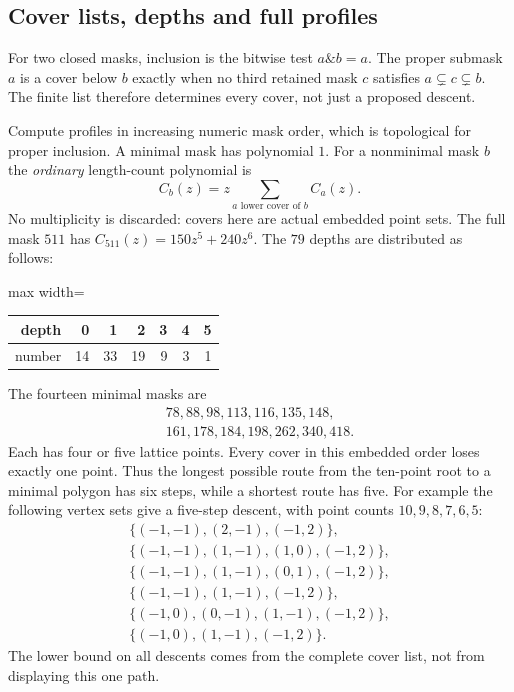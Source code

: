 \documentclass[manuscript]{aomart}
\theoremstyle{definition}
\theoremstyle{remark}
\begin{document}
\subsection{Cover lists, depths and full profiles}
For two closed masks, inclusion is the bitwise test $a\mathbin{\&}b=a$.
The proper submask $a$ is a cover below $b$ exactly when no third retained
mask $c$ satisfies $a\subsetneq c\subsetneq b$. The finite list therefore
determines every cover, not just a proposed descent.

Compute profiles in increasing numeric mask order, which is topological
for proper inclusion. A minimal mask has polynomial $1$. For a nonminimal
mask $b$ the \emph{ordinary} length-count polynomial is
\[
 C_b(z)=z\sum_{a\text{ lower cover of }b}C_a(z).
\]
No multiplicity is discarded: covers here are actual embedded point sets.
The full mask $511$ has $C_{511}(z)=150z^5+240z^6$.
The $79$ depths are distributed as follows:
\begin{center}
\begin{adjustbox}{max width=\linewidth}\begin{tabular}{rrrrrrr}\toprule
depth &0&1&2&3&4&5\\\midrule
number &14&33&19&9&3&1\\\bottomrule
\end{tabular}\end{adjustbox}
\end{center}
The fourteen minimal masks are
\[
\begin{gathered}
78,88,98,113,116,135,148,\\
161,178,184,198,262,340,418.
\end{gathered}
\]
Each has four or five lattice points. Every cover in this embedded order
loses exactly one point. Thus the longest possible route from the
ten-point root to a minimal polygon has six steps, while a shortest
route has five. For example the following vertex sets give a five-step
descent, with point counts $10,9,8,7,6,5$:
\begin{gather*}
\{(-1,-1),(2,-1),(-1,2)\},\\
\{(-1,-1),(1,-1),(1,0),(-1,2)\},\\
\{(-1,-1),(1,-1),(0,1),(-1,2)\},\\
\{(-1,-1),(1,-1),(-1,2)\},\\
\{(-1,0),(0,-1),(1,-1),(-1,2)\},\\
\{(-1,0),(1,-1),(-1,2)\}.
\end{gather*}
The lower bound on all descents comes from the complete cover list,
not from displaying this one path.
\end{document}
